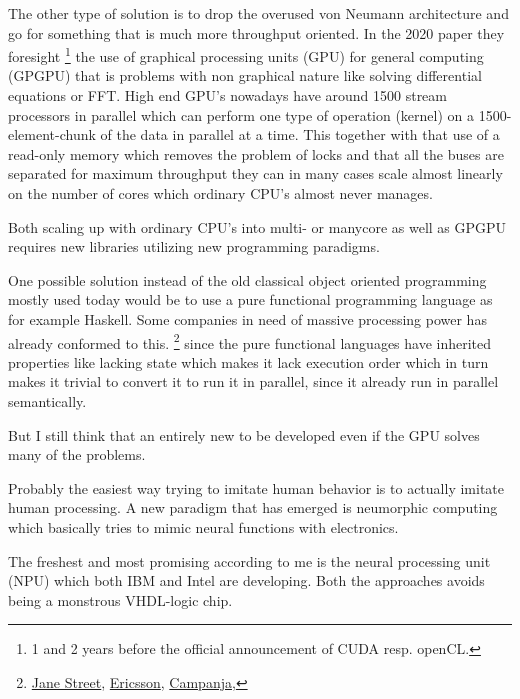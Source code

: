 \documentclass{article}
\begin{document}
    The other type of solution is to drop the overused von Neumann architecture
    and go for something that is much more throughput oriented. In the 2020
    paper\cite{ms2020} they foresight
    \footnote{1 and 2 years before the official 
    announcement of CUDA resp. openCL.} 
    the use of graphical processing units
    (GPU) for general computing (GPGPU) that is problems with non graphical nature like
    solving differential equations or FFT. High end GPU's nowadays have around
    1500 stream processors in parallel which can perform one type of operation
    (kernel)
    on a 1500-element-chunk of the data in parallel at a time. This together
    with that use 
    of a read-only memory which removes the problem of locks
    and that all the buses are separated for
    maximum throughput they can in many cases  scale almost linearly 
    on the number of cores
    which ordinary CPU's almost never manages.

    Both scaling up with ordinary CPU's into multi- or manycore as well as
    GPGPU requires new libraries utilizing new programming paradigms.

    One possible solution instead of the old classical object oriented
    programming mostly used today would be to use a pure functional programming
    language as
    for example Haskell. Some companies in need of massive processing power has
    already conformed to this.
    \footnote{
        \href{http://www.janestreet.com}{Jane Street},
        \href{http://www.ericsson.com}{Ericsson},
        \href{http://www.campanja.com}{Campanja},
    }
    since the pure functional languages 
    have inherited properties like lacking state 
    which makes it lack execution order which in turn makes it
    trivial to convert it 
    to run it in parallel, since it already run in parallel
    semantically.

    But I still think that an entirely new to be developed even if the GPU
    solves many of the problems.
    
    Probably the easiest way trying to imitate human behavior is to actually
    imitate human processing. A new paradigm that has emerged is neumorphic
    computing which basically tries to mimic neural functions with electronics.
    
    The freshest and most promising according to me is the 
    neural processing unit (NPU) which both IBM\cite{synapse} and
    Intel\cite{intelneuro} are developing. Both the approaches avoids being a
    monstrous VHDL-logic chip.
\end{document}
